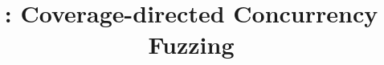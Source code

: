 \title{\sys: Coverage-directed Concurrency Fuzzing}

\ifdefined\DRAFT
 \pagestyle{fancyplain}
 \rhead{\thedate}
\fi



\author{
}


